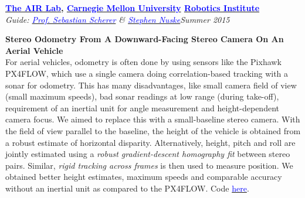 \documentclass[margin,line]{res}
\newenvironment{list1}{
  \begin{list}{\ding{113}}{%
      \setlength{\itemsep}{0in}
      \setlength{\parsep}{0in} \setlength{\parskip}{0in}
      \setlength{\topsep}{0in} \setlength{\partopsep}{0in} 
      \setlength{\leftmargin}{0.17in}}}{\end{list}}
\begin{document}
\begin{resume}
{\bf  \href{http://theairlab.org/}{\textcolor{blue}{The AIR Lab}}, \href{http://www.cmu.edu/}{\textcolor{blue}{Carnegie Mellon University}} \href{http://ri.cmu.edu/}{\textcolor{blue}{Robotics Institute}}} \\
{\em Guide: \href{http://www.ri.cmu.edu/person.html?person_id=1397}{\textcolor{blue}{Prof. Sebastian Scherer}} \& \href{http://www.ri.cmu.edu/person.html?person_id=2128}{\textcolor{blue} {Stephen Nuske}}}\hfill\textit{Summer 2015} \\
\vspace*{-.13in}
\begin{list1}
\item[]\textbf{Stereo Odometry From A Downward-Facing Stereo Camera On An Aerial Vehicle} \\
For aerial vehicles, odometry is often done by using sensors like the Pixhawk PX4FLOW, which use a single camera doing correlation-based tracking with a sonar for odometry. This has many disadvantages, like small camera field of view (small maximum speeds), bad sonar readings at low range (during take-off), requirement of an inertial unit for angle measurement and height-dependent camera focus. We aimed to replace this with a small-baseline stereo camera. With the field of view parallel to the baseline, the height of the vehicle is obtained from a robust estimate of horizontal disparity. Alternatively, height, pitch and roll are jointly estimated using a \textit{robust gradient-descent homography fit} between stereo pairs. Similar, \textit{rigid tracking across frames} is then used to measure position. We obtained better height estimates, maximum speeds and comparable accuracy without an inertial unit as compared to the PX4FLOW. Code \href{https://github.com/alankarkotwal/ground_odom}{\textcolor{blue} {here}}.
\end{list1}


\end{resume}
\end{document}
